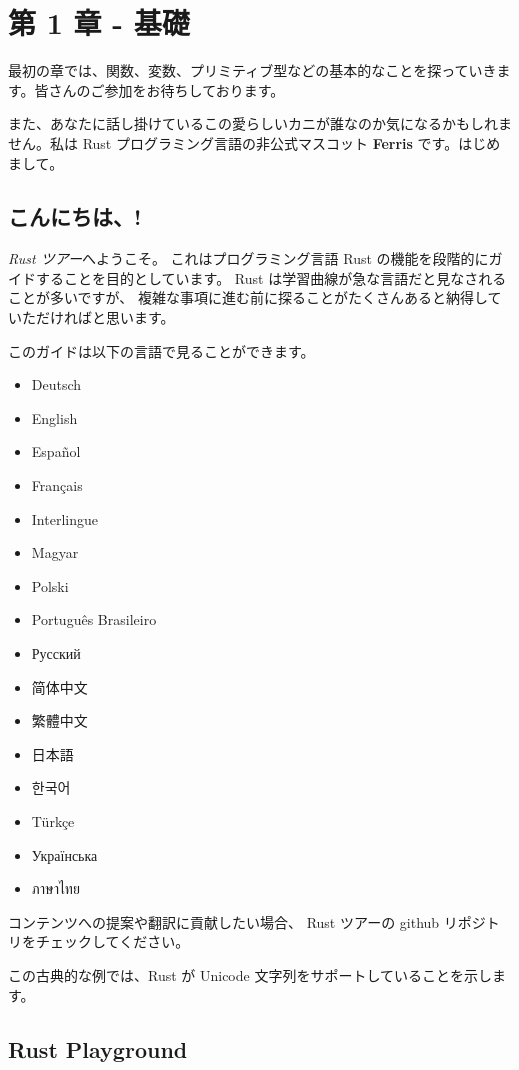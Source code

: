 \section{第 1 章 - 基礎}

最初の章では、関数、変数、プリミティブ型などの基本的なことを探っていきます。皆さんのご参加をお待ちしております。

また、あなたに話し掛けているこの愛らしいカニが誰なのか気になるかもしれません。私は
Rust プログラミング言語の非公式マスコット \textbf{Ferris}
です。はじめまして。

\subsection{こんにちは、!}

\emph{Rust ツアー}へようこそ。 これはプログラミング言語 Rust
の機能を段階的にガイドすることを目的としています。 Rust
は学習曲線が急な言語だと見なされることが多いですが、
複雑な事項に進む前に探ることがたくさんあると納得していただければと思います。

このガイドは以下の言語で見ることができます。

\begin{itemize}
\item
  Deutsch
\item
  English
\item
  Español
\item
  Français
\item
  Interlingue
\item
  Magyar
\item
  Polski
\item
  Português Brasileiro
\item
  Русский
\item
  简体中文
\item
  繁體中文
\item
  日本語
\item
  한국어
\item
  Türkçe
\item
  Українська
\item
  ภาษาไทย
\end{itemize}

コンテンツへの提案や翻訳に貢献したい場合、 Rust ツアーの github
リポジトリをチェックしてください。

この古典的な例では、Rust が Unicode
文字列をサポートしていることを示します。

\subsection{Rust Playground}

